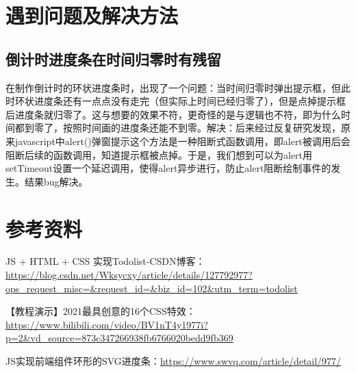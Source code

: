 \documentclass[UTF8]{ctexart}
\begin{document}
	\section{遇到问题及解决方法}%
	\subsection{倒计时进度条在时间归零时有残留}
	在制作倒计时的环状进度条时，出现了一个问题：当时间归零时弹出提示框，但此时环状进度条还有一点点没有走完（但实际上时间已经归零了），但是点掉提示框后进度条就归零了。这与想要的效果不符，更奇怪的是与逻辑也不符，即为什么时间都到零了，按照时间画的进度条还能不到零。解决：后来经过反复研究发现，原来javascript中alert()弹窗提示这个方法是一种阻断式函数调用，即alert被调用后会阻断后续的函数调用，知道提示框被点掉。于是，我们想到可以为alert用setTimeout设置一个延迟调用，使得alert异步进行，防止alert阻断绘制事件的发生。结果bug解决。
	
	
	\section{参考资料} %
	JS + HTML + CSS 实现Todolist-CSDN博客： \url{https://blog.csdn.net/Wksycxy/article/details/127792977?ops_request_misc=&request_id=&biz_id=102&utm_term=todolist}

	
	【教程演示】2021最具创意的16个CSS特效：\url{https://www.bilibili.com/video/BV1nT4y1977i?p=2&vd_source=873c347266938fb6766020bedd9fb369}
	
	JS实现前端组件环形的SVG进度条：\url{https://www.swvq.com/article/detail/977/}
\end{document}
